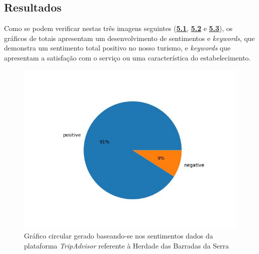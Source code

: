 \subsection{Resultados}

Como se podem verificar nestas três imagens seguintes (\hyperref[fig:exemplofig21sentimentsTrip]{\textbf{5.1}}, \hyperref[fig:exemplofig21keywordsTrip]{\textbf{5.2}} e \hyperref[fig:exemplofig21cloudTrip]{\textbf{5.3}}), os gráficos de totais apresentam um desenvolvimento de sentimentos e \textit{keywords}, que demonstra um sentimento total positivo no nosso turismo, e \textit{keywords} que apresentam a satisfação com o serviço ou uma característica do estabelecimento.

\begin{figure}[!htb]
\centering
\includegraphics[width=14cm]{figuras/TripAdvisor/Hotels/hotel21_sentiments.jpeg}
\caption{Gráfico circular gerado baseando-se nos sentimentos dados da plataforma \textit{TripAdvisor} referente à Herdade das Barradas da Serra}
\label{fig:exemplofig21sentimentsTrip}
\end{figure}

